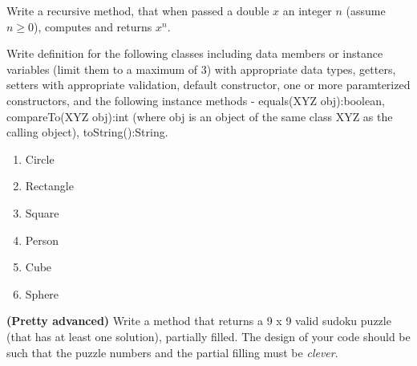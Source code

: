 \begin{questions}
\question Write a recursive method, that when passed a double $x$ an integer $n$ (assume $n \geq 0$), computes and returns $x^n$.

\newpage

\question Write definition for the following classes including data members  or instance variables (limit them to a maximum of 3) with appropriate data types, getters, setters with appropriate validation, default constructor, one or more paramterized constructors, and the following instance methods - equals(XYZ obj):boolean, compareTo(XYZ obj):int (where obj is an object of the same class XYZ as the calling object), toString():String. 

\begin{enumerate}
	\item Circle
	\item Rectangle
	\item Square
	\item Person
	\item Cube
	\item Sphere
\end{enumerate}

\question \textbf{(Pretty advanced)} Write a method that returns a 9 x 9 valid sudoku puzzle (that has at least one solution), partially filled. The design of your code should be such that the puzzle numbers and the partial filling must be \emph{clever}.
\end{questions}


